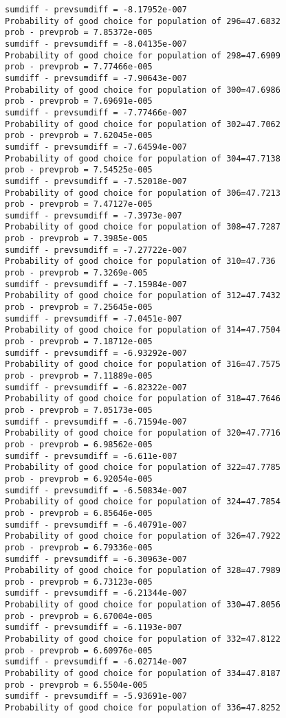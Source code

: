 \documentclass[11pt,onecolumn]{article}
\begin{document}
\begin{verbatim}
sumdiff - prevsumdiff = -8.17952e-007
Probability of good choice for population of 296=47.6832
prob - prevprob = 7.85372e-005
sumdiff - prevsumdiff = -8.04135e-007
Probability of good choice for population of 298=47.6909
prob - prevprob = 7.77466e-005
sumdiff - prevsumdiff = -7.90643e-007
Probability of good choice for population of 300=47.6986
prob - prevprob = 7.69691e-005
sumdiff - prevsumdiff = -7.77466e-007
Probability of good choice for population of 302=47.7062
prob - prevprob = 7.62045e-005
sumdiff - prevsumdiff = -7.64594e-007
Probability of good choice for population of 304=47.7138
prob - prevprob = 7.54525e-005
sumdiff - prevsumdiff = -7.52018e-007
Probability of good choice for population of 306=47.7213
prob - prevprob = 7.47127e-005
sumdiff - prevsumdiff = -7.3973e-007
Probability of good choice for population of 308=47.7287
prob - prevprob = 7.3985e-005
sumdiff - prevsumdiff = -7.27722e-007
Probability of good choice for population of 310=47.736
prob - prevprob = 7.3269e-005
sumdiff - prevsumdiff = -7.15984e-007
Probability of good choice for population of 312=47.7432
prob - prevprob = 7.25645e-005
sumdiff - prevsumdiff = -7.0451e-007
Probability of good choice for population of 314=47.7504
prob - prevprob = 7.18712e-005
sumdiff - prevsumdiff = -6.93292e-007
Probability of good choice for population of 316=47.7575
prob - prevprob = 7.11889e-005
sumdiff - prevsumdiff = -6.82322e-007
Probability of good choice for population of 318=47.7646
prob - prevprob = 7.05173e-005
sumdiff - prevsumdiff = -6.71594e-007
Probability of good choice for population of 320=47.7716
prob - prevprob = 6.98562e-005
sumdiff - prevsumdiff = -6.611e-007
Probability of good choice for population of 322=47.7785
prob - prevprob = 6.92054e-005
sumdiff - prevsumdiff = -6.50834e-007
Probability of good choice for population of 324=47.7854
prob - prevprob = 6.85646e-005
sumdiff - prevsumdiff = -6.40791e-007
Probability of good choice for population of 326=47.7922
prob - prevprob = 6.79336e-005
sumdiff - prevsumdiff = -6.30963e-007
Probability of good choice for population of 328=47.7989
prob - prevprob = 6.73123e-005
sumdiff - prevsumdiff = -6.21344e-007
Probability of good choice for population of 330=47.8056
prob - prevprob = 6.67004e-005
sumdiff - prevsumdiff = -6.1193e-007
Probability of good choice for population of 332=47.8122
prob - prevprob = 6.60976e-005
sumdiff - prevsumdiff = -6.02714e-007
Probability of good choice for population of 334=47.8187
prob - prevprob = 6.5504e-005
sumdiff - prevsumdiff = -5.93691e-007
Probability of good choice for population of 336=47.8252

\end{verbatim}
\end{document}
